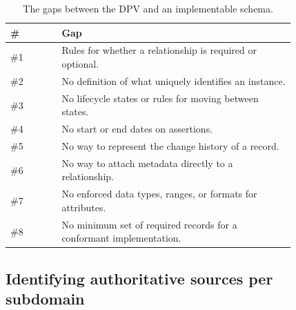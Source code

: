 \documentclass[10pt,letterpaper,twocolumn,twoside]{rho-class/rho}
\begin{document}
\begin{table}[ht]
\centering
\caption{The gaps between the DPV and an implementable schema.}
\label{tab:gaps2}
\footnotesize
\begin{tabular}{@{}l p{0.82\linewidth}@{}}
\hline
\# & Gap \\
\hline
\#1 & Rules for whether a relationship is required or optional.\\
\#2 & No definition of what uniquely identifies an instance. \\
\#3 & No lifecycle states or rules for moving between states. \\
\#4 & No start or end dates on assertions. \\
\#5 & No way to represent the change history of a record. \\
\#6 & No way to attach metadata directly to a relationship. \\
\#7 & No enforced data types, ranges, or formats for attributes. \\
\#8 & No minimum set of required records for a conformant implementation. \\
\hline
\end{tabular}
\end{table}

\subsection{Identifying authoritative sources per subdomain}\label{sec:sources}
\end{document}
